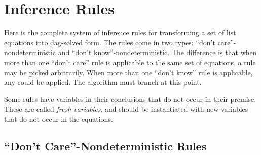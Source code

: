 \documentclass[11pt,twoside,titlepage]{article}
\begin{document}
\section{Inference Rules}\label{appendix:inference}

Here is the complete system of inference rules for transforming a set of list
equations into dag-solved form. The rules come in two types: ``don't
care''-nondeterministic and ``don't know''-nondeterministic. The difference
is that when more than one ``don't care'' rule is applicable to the same
set of equations, a rule may be picked arbitrarily. When more than one ``don't
know'' rule is applicable, any could be applied. The algorithm must branch at
this point.

Some rules have variables in their conclusions that do not occur in their
premise. These are called \emph{fresh variables}, and should be instantiated
with new variables that do not occur in the equations.

\subsection{\texorpdfstring{``Don't Care''}{"Don't Care"}-Nondeterministic Rules}
\end{document}
